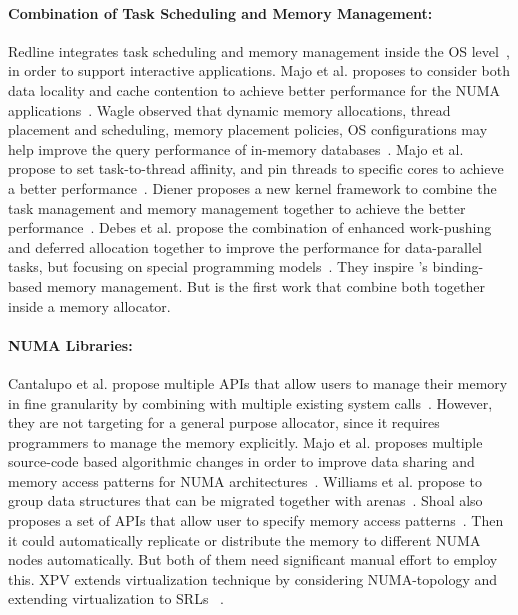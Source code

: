 \paragraph{Combination of Task Scheduling and Memory Management:} Redline integrates task scheduling and memory management inside the OS level~\cite{Redline}, in order to support  interactive applications. 
Majo et al. proposes to consider both data locality and cache contention to achieve better performance for the NUMA applications~\cite{Majo:2011:MMN:1993478.1993481}. Wagle observed that dynamic memory allocations, thread placement and scheduling, memory placement policies, OS configurations may help improve the query performance of in-memory databases~\cite{wagle2015numa}.  Majo et al. propose to set task-to-thread affinity, and pin threads to specific cores to achieve a better performance~\cite{Majo:2015:LPC:2688500.2688509}. Diener proposes a new kernel framework to combine the task management and memory management together to achieve the better performance~\cite{diener2015automatic}. 
Debes et al. propose the combination of enhanced work-pushing and deferred allocation together to improve the performance for data-parallel tasks, but focusing on special programming models~\cite{DBLP:conf/IEEEpact/DrebesPH0D16}. They inspire \NM{}'s binding-based memory management. But \NM{} is the first work that combine both together inside a memory allocator. 



\paragraph{NUMA Libraries:}
Cantalupo et al. propose multiple APIs that allow users to manage their memory in fine granularity by combining with multiple existing system calls~\cite{cantalupo2015memkind}. However, they are not targeting for a general purpose allocator, since it requires programmers to manage the memory explicitly.  Majo et al. proposes multiple source-code based  algorithmic changes in order to improve  data sharing and  memory access patterns for NUMA architectures~\cite{6704666}. Williams et al. propose to group data structures that can be migrated together with arenas~\cite{WilliamsI0L18}. 
Shoal also proposes a set of APIs that allow user to specify memory access patterns~\cite{Kaestle:2015:SSA:2813767.2813787}. Then it could automatically replicate or distribute the memory  to different NUMA nodes automatically. But both of them need significant manual effort to employ this. 
XPV extends virtualization technique by considering NUMA-topology and extending virtualization to SRLs ~\cite{Bui:2019:EPV:3302424.3303960}.

